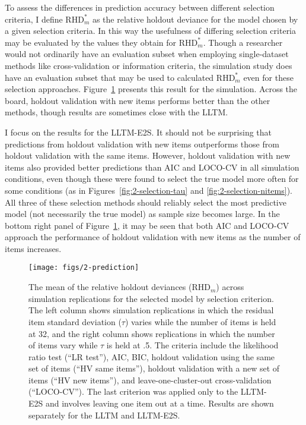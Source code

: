 To assess the differences in prediction accuracy between different selection criteria, I define $\mathrm{RHD}_m^*$ as the relative holdout deviance for the model chosen by a given selection criteria. In this way the usefulness of differing selection criteria may be evaluated by the values they obtain for $\mathrm{RHD}_m^*$. Though a researcher would not ordinarily have an evaluation subset when employing single-dataset methods like cross-validation or information criteria, the simulation study does have an evaluation subset that may be used to calculated $\mathrm{RHD}_m^*$ even for these selection approaches. Figure~\ref{fig:2-prediction} presents this result for the simulation. Across the board, holdout validation with new items performs better than the other methods, though results are sometimes close with the LLTM. 

I focus on the results for the LLTM-E2S. It should not be surprising that predictions from holdout validation with new items outperforms those from holdout validation with the same items. However, holdout validation with new items also provided better predictions than AIC and LOCO-CV in all simulation conditions, even though these were found to select the true model more often for some conditions (as in Figures~\ref{fig:2-selection-tau} and \ref{fig:2-selection-nitems}). All three of these selection methods should reliably select the most predictive model (not necessarily the true model) as sample size becomes large. In the bottom right panel of Figure~\ref{fig:2-prediction}, it may be seen that both AIC and LOCO-CV approach the performance of holdout validation with new items as the number of items increases.

\begin{figure}
	\centering
	\texttt{[image: figs/2-prediction]}
	\caption{The mean of the relative holdout deviances ($\mathrm{RHD}_m$) across simulation replications for the selected model by selection criterion. The left column shows simulation replications in which the residual item standard deviation ($\tau$) varies while the number of items is held at 32, and the right column shows replications in which the number of items vary while $\tau$ is held at .5. The criteria include the likelihood ratio test (``LR test''), AIC, BIC, holdout validation using the same set of items (``HV same items''), holdout validation with a new set of items (``HV new items''), and leave-one-cluster-out cross-validation (``LOCO-CV''). The last criterion was applied only to the LLTM-E2S and involves leaving one item out at a time. Results are shown separately for the LLTM and LLTM-E2S.
	}
	\label{fig:2-prediction}
\end{figure}


